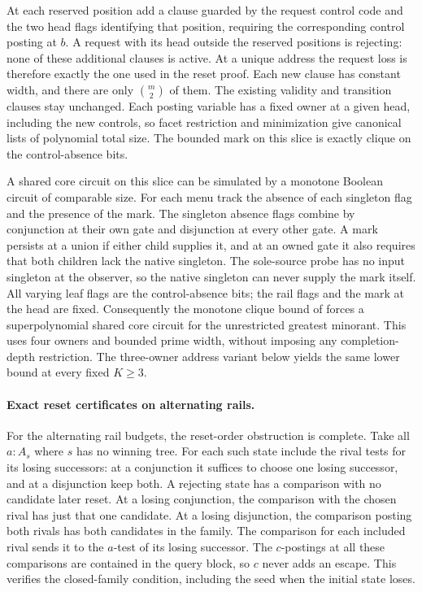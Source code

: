 At each reserved position add a clause guarded
by the request control code and the two head flags
identifying that position, requiring the corresponding
control posting at $b$. A request with its head
outside the reserved positions is rejecting: none
of these additional clauses is active. At a unique
address the request loss is therefore exactly the
one used in the reset proof. Each new clause has
constant width, and there are only $\binom m2$
of them. The existing validity and transition
clauses stay unchanged. Each posting
variable has a fixed owner at a given head, including
the new controls, so facet restriction and minimization
give canonical lists of polynomial total size.
The bounded mark on this slice is exactly clique on
the control-absence bits.

A shared core circuit on this slice can be simulated
by a monotone Boolean circuit of comparable size.
For each menu track the absence of each singleton
flag and the presence of the mark. The singleton
absence flags combine by conjunction at their own
gate and disjunction at every other gate. A mark
persists at a union if either child supplies it, and
at an owned gate it also requires that both children
lack the native singleton. The sole-source probe
has no input singleton at the observer, so the
native singleton can never supply the mark itself.
All varying leaf flags are the control-absence bits;
the rail flags and the mark at the head are fixed.
Consequently the monotone clique bound of
\cite[Theorem~3.9]{AlonBoppana1987} forces a
superpolynomial shared core circuit for the
unrestricted greatest minorant. This uses four
owners and bounded prime width, without
imposing any completion-depth restriction.
The three-owner address variant below yields
the same lower bound at every fixed $K\ge3$.

\paragraph{Exact reset certificates on alternating rails.}
For the alternating rail budgets, the reset-order
obstruction is complete. Take all $a:A_s$ where
$s$ has no winning tree. For each such state
include the rival tests for its losing successors:
at a conjunction it suffices to choose one losing
successor, and at a disjunction keep both. A
rejecting state has a comparison with no candidate
later reset. At a losing conjunction, the comparison
with the chosen rival has just that one candidate.
At a losing disjunction, the comparison posting
both rivals has both candidates in the family.
The comparison for each included rival sends it
to the $a$-test of its losing successor. The
$c$-postings at all these comparisons are contained
in the query block, so $c$ never adds an escape.
This verifies the closed-family condition, including
the seed when the initial state loses.

